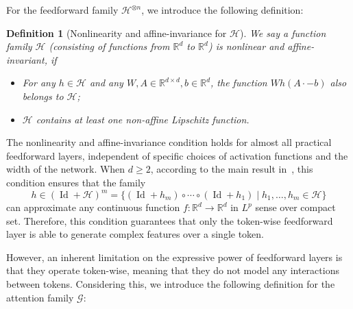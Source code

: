 \documentclass{article}
\newtheorem{definition}{Definition}
\begin{document}
For the feedforward family $\mathcal H^{\otimes n}$, we introduce the following definition:
\begin{definition}[Nonlinearity and affine-invariance for $\mathcal H$]
    \label{def:nonlinearity}
    We say a function family $\mathcal H$ (consisting of functions from $\mathbb{R}^d$ to $\mathbb{R}^d$) is nonlinear and affine-invariant, if 
    \begin{itemize}
        \item For any $h\in \mathcal{H}$ and any $W, A\in \mathbb{R}^{d\times d}, b\in \mathbb{R}^d$, the function $Wh(A\cdot -b)$ also belongs to ${\mathcal{H}}$;
        \item  $\mathcal{H}$ contains at least one non-affine Lipschitz function.
    \end{itemize}
\end{definition}
The nonlinearity and affine-invariance condition holds for almost all practical feedforward layers, independent of specific choices of activation functions and the width of the network. When $d\ge 2$, according to the main result in~\cite{cheng2025interpolation}, this condition ensures that the family
\begin{equation}
    h \in (\operatorname{Id}+\mathcal{H})^m = \{(\operatorname{Id}+h_m)\circ\cdots \circ (\operatorname{Id}+h_1) \mid h_1,\dots, h_m\in \mathcal{H} \}
 \end{equation}
can approximate any continuous function $f:\mathbb R^d\to\mathbb R^d$ in $L^p$ sense over compact set. Therefore, this condition guarantees that only the token-wise feedforward layer is able to generate complex features over a single token. 

However, an inherent limitation on the expressive power of feedforward layers is that they operate token-wise, meaning that they do not model any interactions between tokens. Considering this, we introduce the following definition for the attention family $\mathcal G$:
\end{document}
